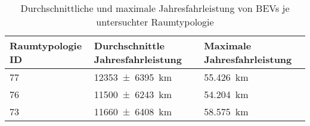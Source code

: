{
\renewcommand{\arraystretch}{1.2}%
\begin{table}[H]
	\begin{center}
		\caption{Durchschnittliche und maximale Jahresfahrleistung von BEVs je untersuchter Raumtypologie}
		\begin{tabu} to \textwidth {X[1] X[1.5, r] X[1.5, r]}
			\hline
			Raumtypologie ID 	   & Durchschnittle Jahresfahrleistung                  & Maximale Jahresfahrleistung \\ \hline
			\num{77}               & \SI[separate-uncertainty = true]{12353(6395)}{\km} & \SI{55.426}{\km}            \\
			\num{76}               & \SI[separate-uncertainty = true]{11500(6243)}{\km} & \SI{54.204}{\km}            \\
			\num{73}               & \SI[separate-uncertainty = true]{11660(6408)}{\km} & \SI{58.575}{\km}            \\ \hline
		\end{tabu}
		\label{tab:bev_distance}
	\end{center}
	\vspace{-3mm}%
\end{table}
}